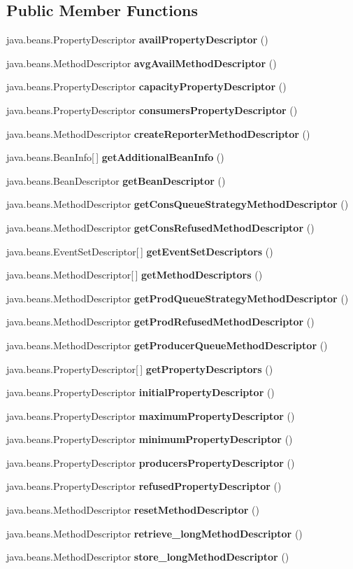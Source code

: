 \subsection*{Public Member Functions}
\begin{DoxyCompactItemize}
\item 
java.\-beans.\-Property\-Descriptor {\bf avail\-Property\-Descriptor} ()
\item 
java.\-beans.\-Method\-Descriptor {\bf avg\-Avail\-Method\-Descriptor} ()
\item 
java.\-beans.\-Property\-Descriptor {\bf capacity\-Property\-Descriptor} ()
\item 
java.\-beans.\-Property\-Descriptor {\bf consumers\-Property\-Descriptor} ()
\item 
java.\-beans.\-Method\-Descriptor {\bf create\-Reporter\-Method\-Descriptor} ()
\item 
java.\-beans.\-Bean\-Info[$\,$] {\bf get\-Additional\-Bean\-Info} ()
\item 
java.\-beans.\-Bean\-Descriptor {\bfseries get\-Bean\-Descriptor} ()\label{classdesmoj_1_1core_1_1advanced_modelling_features_1_1_stock_bean_info_a64ff7df1253323363c75676cd5579606}

\item 
java.\-beans.\-Method\-Descriptor {\bf get\-Cons\-Queue\-Strategy\-Method\-Descriptor} ()
\item 
java.\-beans.\-Method\-Descriptor {\bf get\-Cons\-Refused\-Method\-Descriptor} ()
\item 
java.\-beans.\-Event\-Set\-Descriptor[$\,$] {\bf get\-Event\-Set\-Descriptors} ()
\item 
java.\-beans.\-Method\-Descriptor[$\,$] {\bf get\-Method\-Descriptors} ()
\item 
java.\-beans.\-Method\-Descriptor {\bf get\-Prod\-Queue\-Strategy\-Method\-Descriptor} ()
\item 
java.\-beans.\-Method\-Descriptor {\bf get\-Prod\-Refused\-Method\-Descriptor} ()
\item 
java.\-beans.\-Method\-Descriptor {\bf get\-Producer\-Queue\-Method\-Descriptor} ()
\item 
java.\-beans.\-Property\-Descriptor[$\,$] {\bf get\-Property\-Descriptors} ()
\item 
java.\-beans.\-Property\-Descriptor {\bf initial\-Property\-Descriptor} ()
\item 
java.\-beans.\-Property\-Descriptor {\bf maximum\-Property\-Descriptor} ()
\item 
java.\-beans.\-Property\-Descriptor {\bf minimum\-Property\-Descriptor} ()
\item 
java.\-beans.\-Property\-Descriptor {\bf producers\-Property\-Descriptor} ()
\item 
java.\-beans.\-Property\-Descriptor {\bf refused\-Property\-Descriptor} ()
\item 
java.\-beans.\-Method\-Descriptor {\bf reset\-Method\-Descriptor} ()
\item 
java.\-beans.\-Method\-Descriptor {\bf retrieve\-\_\-long\-Method\-Descriptor} ()
\item 
java.\-beans.\-Method\-Descriptor {\bf store\-\_\-long\-Method\-Descriptor} ()
\end{DoxyCompactItemize}
